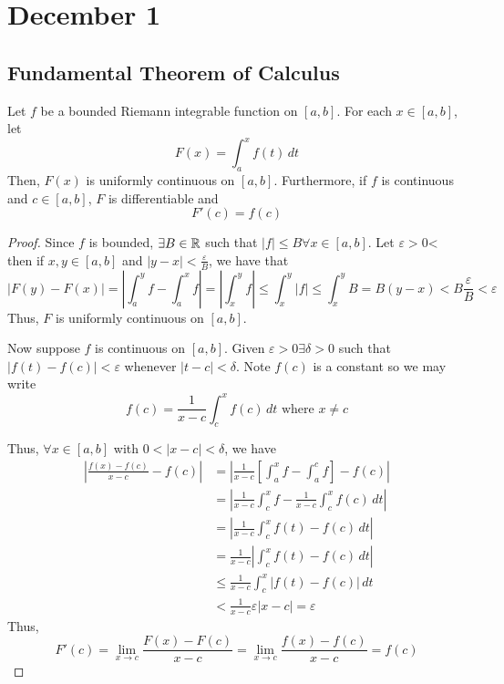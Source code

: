 \section{December 1}

\subsection{Fundamental Theorem of Calculus}
\begin{theorem}
    Let $f$ be a bounded Riemann integrable function on $[a, b]$. For each $x \in [a, b]$, let $$F(x) = \int_a^x f(t) \, dt$$ Then, $F(x)$ is uniformly continuous on $[a, b]$. Furthermore, if $f$ is continuous and $c \in [a, b]$, $F$ is differentiable and $$F'(c) = f(c)$$
\end{theorem}
\begin{proof}
    Since $f$ is bounded, $\exists B \in \mathbb{R}$ such that $|f| \leq B \forall x \in [a, b]$. Let $\varepsilon > 0$< then if $x, y \in [a, b]$ and $|y - x| < \frac{\varepsilon}{B}$, we have that $$|F(y) - F(x)| = \left|\int_a^y f - \int_a^x f\right| = \left|\int_x^y f\right| \leq \int_x^y |f| \leq \int_x^y B = B(y - x) < B \frac{\varepsilon}{B}< \varepsilon$$ Thus, $F$ is uniformly continuous on $[a, b]$.

    Now suppose $f$ is continuous on $[a, b]$. Given $\varepsilon > 0 \exists \delta > 0$ such that $|f(t) - f(c)| < \varepsilon$ whenever $|t - c| < \delta$. Note $f(c)$ is a constant so we may write $$f(c) = \frac{1}{x - c} \int_c^x f(c) \, dt \text{ where } x \neq c$$
    
    Thus, $\forall x \in [a, b]$ with $0 < |x - c| < \delta$, we have
    \begin{align*}
        \left|\frac{f(x) - f(c)}{x - c} - f(c)\right| &= \left|\frac{1}{x - c} \left[\int_a^x f - \int_a^c f\right] - f(c) \right| \\
        &= \left|\frac{1}{x - c} \int_c^x f - \frac{1}{x - c} \int_c^x f(c) \, dt\right| \\
        &= \left|\frac{1}{x - c} \int_c^x f(t) - f(c) \, dt\right| \\
        &= \frac{1}{x - c} \left|\int_c^x f(t) - f(c) \, dt\right| \\
        &\leq \frac{1}{x - c} \int_c^x |f(t) - f(c)| \, dt \\
        &< \frac{1}{x - c} \varepsilon |x - c| = \varepsilon
    \end{align*}
    Thus, $$F'(c) = \lim_{x \to c} \frac{F(x) - F(c)}{x - c} = \lim_{x \to c} \frac{f(x) - f(c)}{x - c} = f(c)$$
\end{proof}
\pagebreak

